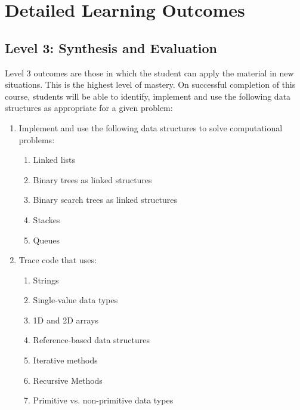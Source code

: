 \documentclass[12pt]{scrartcl}
\begin{document}
\section{Detailed Learning Outcomes}

\subsection*{Level 3: Synthesis and Evaluation}
Level 3 outcomes are those in which the student can apply the material in new situations. This is the highest level of mastery. On successful completion of this course, students will be able to identify, implement and use the following data structures as appropriate for a given problem:
\begin{enumerate}
    \item Implement and use the following data structures to solve computational problems:
    \begin{enumerate}
        \item Linked lists
        \item Binary trees as linked structures
        \item Binary search trees as linked structures
        \item Stackes
        \item Queues
    \end{enumerate}
    \item Trace code that uses:
    \begin{enumerate}
    	\item Strings
	\item Single-value data types
	\item 1D and 2D arrays
	\item Reference-based data structures
	\item Iterative methods
	\item Recursive Methods
	\item Primitive vs. non-primitive data types
    \end{enumerate}
\end{enumerate}
\end{document}
